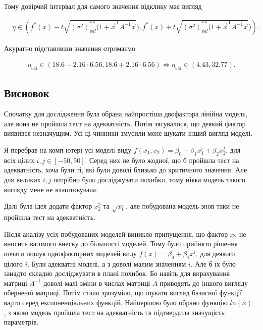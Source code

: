 \documentclass[14pt,a4paper]{scrartcl}
\theoremstyle{definition}
\theoremstyle{remark}
\theoremstyle{definition}
\theoremstyle{definition}
\begin{document}
Тому довірчий інтервал для самого значення відклику має вигляд

\begin{align*}
  & \eta \in \left( f^{*}(x) - t\sqrt{(\sigma^2)^{**}_{val} (1 + \vec{x}^\mathsf{T} A^{-1} \vec{x}}), f^{*}(x) + t\sqrt{(\sigma^2)^{**}_{val} (1 + \vec{x}^\mathsf{T} A^{-1} \vec{x}})  \right).
\end{align*}

Акуратно підставивши значення отримаємо

\begin{align*}
  & \eta_{val} \in \left( 18.6 - 2.16 \cdot 6.56, 18.6 + 2.16 \cdot 6.56  \right) \Leftrightarrow \eta_{val} \in \left( 4.43, 32.77  \right).
\end{align*}

\subsection{Висновок}

Спочатку для дослідження була обрана найпростіша двофактора лінійна модель, але вона не пройшла тест на адекватність. Потім з\textquotesingle ясувалося, що деякий фактор виявився незначущим. Усі ці чинники змусили мене шукати інший вигляд моделі.

Я перебрав на комп \textquotesingle ютері усі моделі виду $f(x_{1}, x_{2}) = \beta_{0} + \beta_{1} x_{1}^{i} + \beta_{2} x_{2}^{j}$, для всіх цілих $i, j \in [-50, 50]$. Серед них не було жодної, що б пройшла тест на адекватність, хоча були ті, які були доволі близько до критичного значення. Але для великих $i, j$ потрібно було досліджувати похибки, тому ніяка модель такого вигляду мене не влаштовувала.

Далі була ідея додати фактор $x_{2}^{2}$ та $\sqrt{x_{1}}$, але побудована модель знов таки не пройшла тест на адекватність.

Після аналізу усіх побудованих моделей виникло припущення, що фактор $x_{2}$ не вносить вагомого внеску до більшості моделей. Тому було прийнято рішення почати пошук однофакторних моделей виду $f(x) = \beta_{0} + \beta_{1} x^{i}$, для деякого цілого $i$. Були адекватні моделі, а з доволі малим значенням $i$. Але б їх було занадто складно досліджувати в плані похибок. Бо навіть для вирахування матриці $A^{-1}$ доволі малі зміни в числах матриці $A$ приводять до іншого вигляду оберненої матриці. Потім стало зрозуміло, що шукати вигляд базисної функції варто серед експоненціальних функцій. Найпершою було обрано функцію $ln(x)$, з якою модель пройшла тест на адекватність та підтвердила значущість параметрів.

\nocite{*}


%
\end{document}
